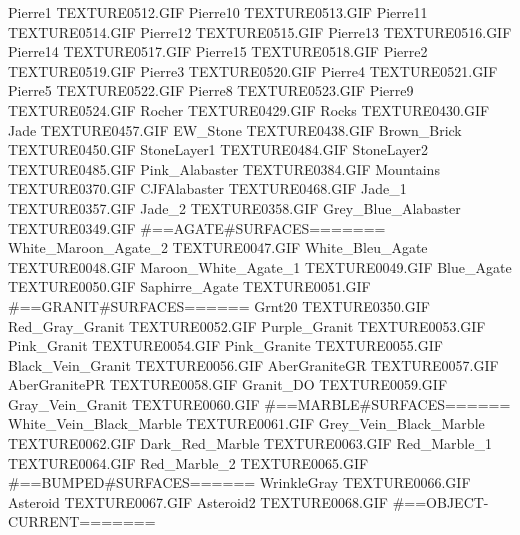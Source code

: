 Pierre1                        TEXTURE\TEX0512.GIF
Pierre10                       TEXTURE\TEX0513.GIF
Pierre11                       TEXTURE\TEX0514.GIF
Pierre12                       TEXTURE\TEX0515.GIF
Pierre13                       TEXTURE\TEX0516.GIF
Pierre14                       TEXTURE\TEX0517.GIF
Pierre15                       TEXTURE\TEX0518.GIF
Pierre2                        TEXTURE\TEX0519.GIF
Pierre3                        TEXTURE\TEX0520.GIF
Pierre4                        TEXTURE\TEX0521.GIF
Pierre5                        TEXTURE\TEX0522.GIF
Pierre8                        TEXTURE\TEX0523.GIF
Pierre9                        TEXTURE\TEX0524.GIF
Rocher                         TEXTURE\TEX0429.GIF
Rocks                          TEXTURE\TEX0430.GIF
Jade                           TEXTURE\TEX0457.GIF
EW_Stone                       TEXTURE\TEX0438.GIF
Brown_Brick                    TEXTURE\TEX0450.GIF
StoneLayer1                    TEXTURE\TEX0484.GIF
StoneLayer2                    TEXTURE\TEX0485.GIF
Pink_Alabaster                 TEXTURE\TEX0384.GIF
Mountains                      TEXTURE\TEX0370.GIF
CJFAlabaster                   TEXTURE\TEX0468.GIF
Jade_1                         TEXTURE\TEX0357.GIF
Jade_2                         TEXTURE\TEX0358.GIF
Grey_Blue_Alabaster            TEXTURE\TEX0349.GIF
#==AGATE#SURFACES=======
White_Maroon_Agate_2           TEXTURE\TEX0047.GIF
White_Bleu_Agate               TEXTURE\TEX0048.GIF
Maroon_White_Agate_1           TEXTURE\TEX0049.GIF
Blue_Agate                     TEXTURE\TEX0050.GIF
Saphirre_Agate                 TEXTURE\TEX0051.GIF
#==GRANIT#SURFACES======
Grnt20                         TEXTURE\TEX0350.GIF
Red_Gray_Granit                TEXTURE\TEX0052.GIF
Purple_Granit                  TEXTURE\TEX0053.GIF
Pink_Granit                    TEXTURE\TEX0054.GIF
Pink_Granite                   TEXTURE\TEX0055.GIF
Black_Vein_Granit              TEXTURE\TEX0056.GIF
AberGraniteGR                  TEXTURE\TEX0057.GIF
AberGranitePR                  TEXTURE\TEX0058.GIF
Granit_DO                      TEXTURE\TEX0059.GIF
Gray_Vein_Granit               TEXTURE\TEX0060.GIF
#==MARBLE#SURFACES======
White_Vein_Black_Marble        TEXTURE\TEX0061.GIF
Grey_Vein_Black_Marble         TEXTURE\TEX0062.GIF
Dark_Red_Marble                TEXTURE\TEX0063.GIF
Red_Marble_1                   TEXTURE\TEX0064.GIF
Red_Marble_2                   TEXTURE\TEX0065.GIF
#==BUMPED#SURFACES======
WrinkleGray                    TEXTURE\TEX0066.GIF
Asteroid                       TEXTURE\TEX0067.GIF
Asteroid2                      TEXTURE\TEX0068.GIF
#==OBJECT-CURRENT=======
